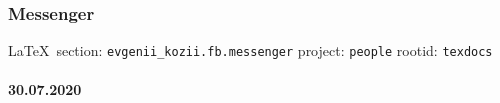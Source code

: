  
 

\subsubsection{Messenger}
  
\vspace{0.5cm}
 {\ifDEBUG\small\LaTeX~section: \verb|evgenii_kozii.fb.messenger| project: \verb|people| rootid: \verb|texdocs|	\fi}
\vspace{0.5cm}
  
\paragraph{30.07.2020}

\def\itemek#1{\item\blue #1}
\def\itemap{\item\red}


